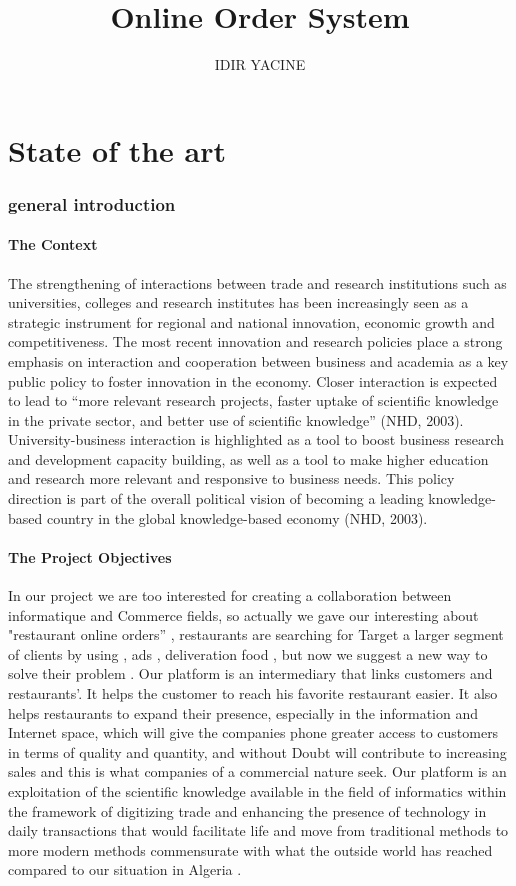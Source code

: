 \documentclass{article}
\title {Online Order System}
\author{IDIR YACINE}
\begin{document}
\maketitle
\tableofcontents
\newpage

\part{State of the art}
\section{general introduction}
\subsection{The Context}
The strengthening of interactions between trade and research institutions such as universities, colleges and research institutes has been increasingly seen as a strategic instrument for regional and national innovation, economic growth and competitiveness. The most recent innovation and research policies place a strong emphasis on interaction and cooperation between business and academia as a key public policy to foster innovation in the economy. Closer interaction is expected to lead to “more relevant research projects, faster uptake of scientific knowledge in the private sector, and better use of scientific knowledge” (NHD, 2003).
University-business interaction is highlighted as a tool to boost business research and development capacity building, as well as a tool to make higher education and research more relevant and responsive to business needs. This policy direction is part of the overall political vision of becoming a leading knowledge-based country in the global knowledge-based economy (NHD, 2003).
\subsection{The Project Objectives}
In our project we are too interested for creating a collaboration between informatique and Commerce fields, so actually we gave our interesting about "restaurant online orders” , restaurants are searching  for Target a larger segment of clients by using , ads , deliveration food , but now we suggest  a new way to solve their problem . 
Our platform is an intermediary that links customers and restaurants’. It helps the customer to reach his favorite restaurant easier. It also helps restaurants to expand their presence, especially in the information and Internet space, which will give the companies phone greater access to customers in terms of quality and quantity, and without Doubt will contribute to increasing sales and this is what companies of a commercial nature seek.
     Our platform is an exploitation of the scientific knowledge available in the field of informatics within the framework of digitizing trade and enhancing the presence of technology in daily transactions that would facilitate life and move from traditional methods to more modern methods commensurate with what the outside world has reached compared to our situation in Algeria .
\end{document}
